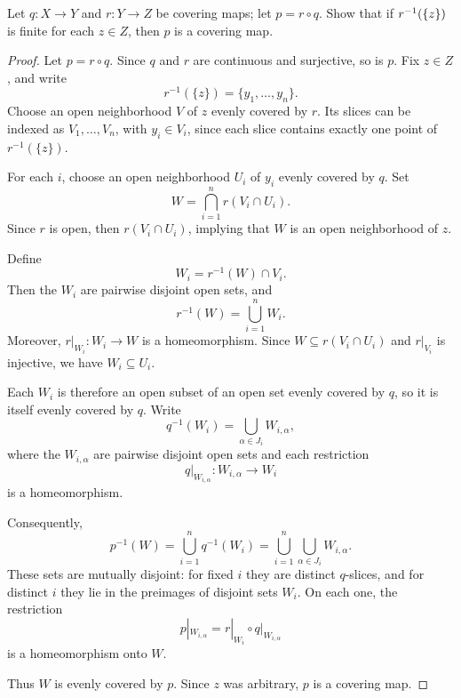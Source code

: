 \documentclass[12pt,a4paper]{article}
\begin{document}
    \begin{ex}
        Let $q:X\to Y$ and $r:Y\to Z$ be covering maps; let $p=r\circ q$. Show that if $r^{-1}(\left\{ z \right\})$ is finite for each $z\in Z$, then $p$ is a covering map. 
    \end{ex}
    \begin{proof}
        Let $p=r\circ q$. Since $q$ and $r$ are continuous and surjective,
        so is $p$. Fix $z\in Z$, and write
        \[
            r^{-1}(\{z\})=\{y_1,\dots,y_n\}.
        \]
        Choose an open neighborhood $V$ of $z$ evenly covered by $r$.
        Its slices can be indexed as $V_1,\dots,V_n$, with $y_i\in V_i$,
        since each slice contains exactly one point of $r^{-1}(\{z\})$.
        
        For each $i$, choose an open neighborhood $U_i$ of $y_i$
        evenly covered by $q$. Set
        \[
            W=\bigcap_{i=1}^n r(V_i\cap U_i).
        \]
        Since $r$ is open, then $r(V_i\cap U_i)$, implying that $W$ is an open neighborhood of $z$.
        
        Define
        \[
            W_i=r^{-1}(W)\cap V_i.
        \]
        Then the $W_i$ are pairwise disjoint open sets, and
        \[
            r^{-1}(W)=\bigcup_{i=1}^n W_i.
        \]
        Moreover, $r|_{W_i}:W_i\to W$ is a homeomorphism.
        Since $W\subseteq r(V_i\cap U_i)$ and $r|_{V_i}$ is injective,
        we have $W_i\subseteq U_i$.
        
        Each $W_i$ is therefore an open subset of an open set evenly
        covered by $q$, so it is itself evenly covered by $q$. Write
        \[
            q^{-1}(W_i)=\bigcup_{\alpha\in J_i}W_{i,\alpha},
        \]
        where the $W_{i,\alpha}$ are pairwise disjoint open sets and
        each restriction
        \[
            q|_{W_{i,\alpha}}:W_{i,\alpha}\to W_i
        \]
        is a homeomorphism.
        
        Consequently,
        \[
            p^{-1}(W)
            =\bigcup_{i=1}^n q^{-1}(W_i)
            =\bigcup_{i=1}^n\bigcup_{\alpha\in J_i}W_{i,\alpha}.
        \]
        These sets are mutually disjoint: for fixed $i$ they are distinct
        $q$-slices, and for distinct $i$ they lie in the preimages of
        disjoint sets $W_i$. On each one, the restriction
        \[
            p|_{W_{i,\alpha}}
            =r|_{W_i}\circ q|_{W_{i,\alpha}}
        \]
        is a homeomorphism onto $W$.
        
        Thus $W$ is evenly covered by $p$. Since $z$ was arbitrary,
        $p$ is a covering map.
    \end{proof}
    \bigskip
\end{document}
